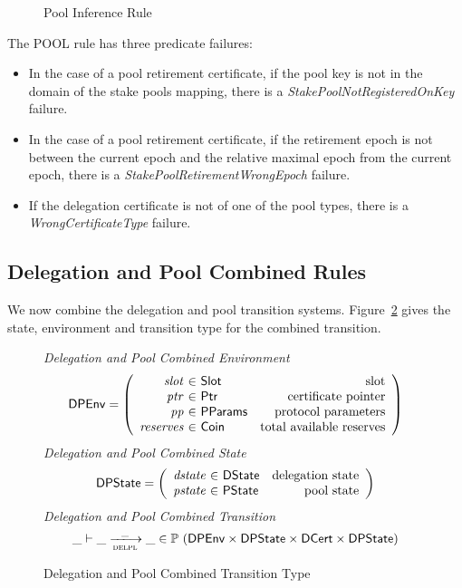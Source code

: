 \begin{figure}[hbt]
  \caption{Pool Inference Rule}
  \label{fig:pool-rules}

\end{figure}

The POOL rule has three predicate failures:
\begin{itemize}
\item In the case of a pool retirement certificate, if the pool key is not in
  the domain of the stake pools mapping, there is a
  \emph{StakePoolNotRegisteredOnKey} failure.
\item In the case of a pool retirement certificate, if the retirement epoch is
  not between the current epoch and the relative maximal epoch from the current
  epoch, there is a \emph{StakePoolRetirementWrongEpoch} failure.
\item If the delegation certificate is not of one of the pool types, there is a
  \emph{WrongCertificateType} failure.
\end{itemize}

\clearpage

\subsection{Delegation and Pool Combined Rules}
\label{sec:del-pool-rules}

We now combine the delegation and pool transition systems.
Figure~\ref{fig:defs:delpl} gives the state, environment and transition type for the
combined transition.

\begin{figure}[hbt]
  \emph{Delegation and Pool Combined Environment}
  \begin{equation*}
    \DPEnv =
    \left(
      \begin{array}{r@{~\in~}lr}
        \var{slot} & \Slot & \text{slot}\\
        \var{ptr} & \Ptr & \text{certificate pointer}\\
        \var{pp} & \PParams & \text{protocol parameters}\\
        \var{reserves} & \Coin & \text{total available reserves}
      \end{array}
    \right)
  \end{equation*}
  \emph{Delegation and Pool Combined State}
  \begin{equation*}
    \DPState =
    \left(
      \begin{array}{r@{~\in~}lr}
        \var{dstate} & \DState & \text{delegation state}\\
        \var{pstate} & \PState & \text{pool state}\\
      \end{array}
    \right)
  \end{equation*}
  \emph{Delegation and Pool Combined Transition}
  \begin{equation*}
    \_ \vdash \_ \trans{delpl}{\_} \_ \in
      \powerset (
        \DPEnv \times \DPState \times \DCert \times \DPState)
  \end{equation*}
  \caption{Delegation and Pool Combined Transition Type}
  \label{fig:defs:delpl}
\end{figure}

